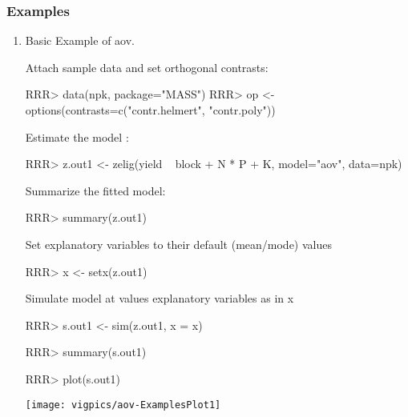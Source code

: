 \subsubsection{Examples}\begin{enumerate}

\item Basic Example of aov.

Attach sample data and set orthogonal contrasts:
\begin{Schunk}
\begin{Sinput}
RRR>  data(npk, package="MASS")
RRR>  op <- options(contrasts=c("contr.helmert", "contr.poly"))
\end{Sinput}
\end{Schunk}
Estimate the model \citep[p.165]{VenRip02}:
\begin{Schunk}
\begin{Sinput}
RRR>  z.out1 <- zelig(yield ~ block + N * P + K, model="aov", data=npk)
\end{Sinput}
\end{Schunk}
Summarize the fitted model:
\begin{Schunk}
\begin{Sinput}
RRR>  summary(z.out1)
\end{Sinput}
\end{Schunk}
Set explanatory variables to their default (mean/mode) values
\begin{Schunk}
\begin{Sinput}
RRR>  x <- setx(z.out1)
\end{Sinput}
\end{Schunk}
Simulate model at values explanatory variables as in x
\begin{Schunk}
\begin{Sinput}
RRR>  s.out1 <- sim(z.out1, x = x)
\end{Sinput}
\end{Schunk}
\begin{Schunk}
\begin{Sinput}
RRR> summary(s.out1)
\end{Sinput}
\end{Schunk}
\begin{center}
\begin{Schunk}
\begin{Sinput}
RRR>  plot(s.out1)
\end{Sinput}
\end{Schunk}
\texttt{[image: vigpics/aov-ExamplesPlot1]}
\end{center}


\end{enumerate}
